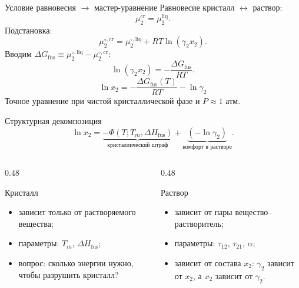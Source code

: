 \documentclass[aspectratio=169,10pt]{beamer}
\newcommand{\smallnote}[1]{{\scriptsize\color{TGSlate}#1}}
\newcommand{\tightitems}{\setlength{\itemsep}{0.25em}}
\begin{document}
\begin{frame}{Условие равновесия $\to$ мастер-уравнение}
  \small
  Равновесие кристалл $\leftrightarrow$ раствор:
  \[
    \mu_2^{\mathrm{cr}}=\mu_2^{\mathrm{liq}}.
  \]
  \pause
  Подстановка:
  \[
    \mu_2^{\circ,\mathrm{cr}}=\mu_2^{\circ,\mathrm{liq}}+RT\ln(\gamma_2 x_2).
  \]
  \pause
  Вводим $\Delta G_{\mathrm{fus}}\equiv\mu_2^{\circ,\mathrm{liq}}-\mu_2^{\circ,\mathrm{cr}}$:
  \[
    \ln(\gamma_2 x_2)=-\frac{\Delta G_{\mathrm{fus}}}{RT}.
  \]
  \pause
  \[
    \boxed{\ln x_2=-\frac{\Delta G_{\mathrm{fus}}(T)}{RT}-\ln\gamma_2}
  \]
  \smallnote{Точное уравнение при чистой кристаллической фазе и $P\approx1$ атм.}
\end{frame}

\begin{frame}{Структурная декомпозиция}
  \[
    \ln x_2=
    \underbrace{-\Phi(T;T_m,\Delta H_{\mathrm{fus}})}_{\text{кристаллический штраф}}
    +
    \underbrace{(-\ln\gamma_2)}_{\text{комфорт в растворе}}.
  \]
  \begin{columns}[T,onlytextwidth]
    \begin{column}{0.48\textwidth}
      \begin{block}{Кристалл}
        \begin{itemize}\tightitems
          \item зависит только от растворяемого вещества;
          \item параметры: $T_m$, $\Delta H_{\mathrm{fus}}$;
          \item вопрос: сколько энергии нужно, чтобы разрушить кристалл?
        \end{itemize}
      \end{block}
    \end{column}
    \begin{column}{0.48\textwidth}
      \begin{block}{Раствор}
        \begin{itemize}\tightitems
          \item зависит от пары вещество–растворитель;
          \item параметры: $\tau_{12}$, $\tau_{21}$, $\alpha$;
          \item зависит от состава $x_2$: $\gamma_2$ зависит от $x_2$, а $x_2$ зависит от $\gamma_2$.
        \end{itemize}
      \end{block}
    \end{column}
  \end{columns}
\end{frame}
\end{document}
